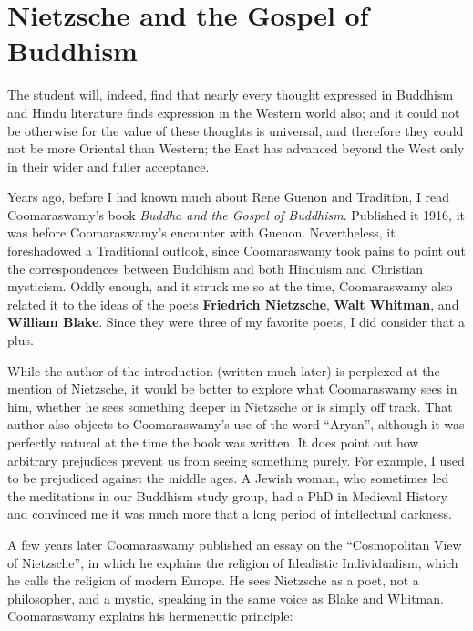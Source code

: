 \section{Nietzsche and the Gospel of Buddhism}

\begin{quotex}
The student will, indeed, find that nearly every thought expressed in Buddhism and Hindu literature finds expression in the Western world also; and it could not be otherwise for the value of these thoughts is universal, and therefore they could not be more Oriental than Western; the East has advanced beyond the West only in their wider and fuller acceptance.
\end{quotex}


Years ago, before I had known much about Rene Guenon and Tradition, I read Coomaraswamy's book \textit{Buddha and the Gospel of Buddhism}. Published it 1916, it was before Coomaraswamy's encounter with Guenon. Nevertheless, it foreshadowed a Traditional outlook, since Coomaraswamy took pains to point out the correspondences between Buddhism and both Hinduism and Christian mysticism. Oddly enough, and it struck me so at the time, Coomaraswamy also related it to the ideas of the poets \textbf{Friedrich Nietzsche}, \textbf{Walt Whitman}, and \textbf{William Blake}. Since they were three of my favorite poets, I did consider that a plus.

While the author of the introduction (written much later) is perplexed at the mention of Nietzsche, it would be better to explore what Coomaraswamy sees in him, whether he sees something deeper in Nietzsche or is simply off track. That author also objects to Coomaraswamy's use of the word ``Aryan'', although it was perfectly natural at the time the book was written. It does point out how arbitrary prejudices prevent us from seeing something purely. For example, I used to be prejudiced against the middle ages. A Jewish woman, who sometimes led the meditations in our Buddhism study group, had a PhD in Medieval History and convinced me it was much more that a long period of intellectual darkness.

A few years later Coomaraswamy published an essay on the ``Cosmopolitan View of Nietzsche'', in which he explains the religion of Idealistic Individualism, which he calls the religion of modern Europe. He sees Nietzsche as a poet, not a philosopher, and a mystic, speaking in the same voice as Blake and Whitman. Coomaraswamy explains his hermeneutic principle:

